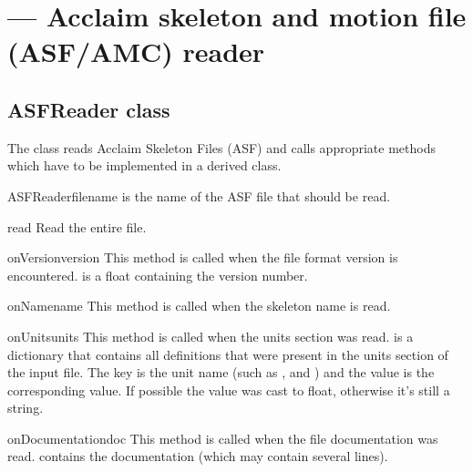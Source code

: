\section{ ---
          Acclaim skeleton and motion file (ASF/AMC) reader}


\subsection{ASFReader class}

The  class reads Acclaim Skeleton Files (ASF) and
calls appropriate methods which have to be implemented in a derived class.

\begin{classdesc}{ASFReader}{filename}
   is the name of the ASF file that should be read.
\end{classdesc}

\begin{methoddesc}{read}{}
Read the entire file.
\end{methoddesc}

\begin{methoddesc}{onVersion}{version}
This method is called when the file format version is encountered.
 is a float containing the version number.
\end{methoddesc}

\begin{methoddesc}{onName}{name}
This method is called when the skeleton name is read.
\end{methoddesc}

\begin{methoddesc}{onUnits}{units}
This method is called when the units section was read. 
is a dictionary that contains all definitions that were present in the
units section of the input file. The key is the unit name (such as
,  and ) and the value is the 
corresponding value. If possible the value was cast to float, otherwise
it's still a string.
\end{methoddesc}

\begin{methoddesc}{onDocumentation}{doc}
This method is called when the file documentation was read. 
contains the documentation (which may contain several lines).
\end{methoddesc}

